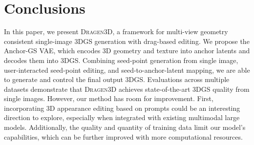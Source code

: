 \section{Conclusions}





In this paper, we present \textsc{Dragen3D}, a framework for multi-view geometry consistent single-image 3DGS generation with drag-based editing.  
We propose the Anchor-GS VAE, which encodes 3D geometry and texture into anchor latents and decodes them into 3DGS. Combining seed-point generation from single image, user-interacted seed-point editing, and seed-to-anchor-latent mapping, we are able to generate and control the final output 3DGS. Evaluations across multiple datasets demonstrate that \textsc{Dragen3D} achieves state-of-the-art 3DGS quality from single images.
However, our method has room for improvement. First, incorporating 3D appearance editing based on prompts could be an interesting direction to explore, especially when integrated with existing multimodal large models. 
Additionally, the quality and quantity of training data limit our model's capabilities, which can be further improved with more computational resources.


